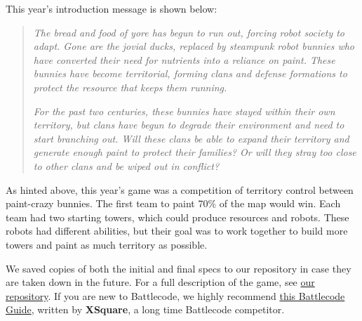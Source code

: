 This year's introduction message is shown below:

\begin{quote}
  \textit{The bread and food of yore has begun to run out, forcing robot society to adapt. Gone are the jovial ducks, replaced by steampunk robot bunnies who have converted their need for nutrients into a reliance on paint. These bunnies have become territorial, forming clans and defense formations to protect the resource that keeps them running.}
  
  \medskip
  
  \textit{For the past two centuries, these bunnies have stayed within their own territory, but clans have begun to degrade their environment and need to start branching out. Will these clans be able to expand their territory and generate enough paint to protect their families? Or will they stray too close to other clans and be wiped out in conflict?}
\end{quote}

As hinted above, this year's game was a competition of territory control between paint-crazy bunnies. The first team to paint 70\% of the map would win. Each team had two starting towers, which could produce resources and robots. These robots had different abilities, but their goal was to work together to build more towers and paint as much territory as possible.

\medskip

We saved copies of both the initial and final specs to our repository in case they are taken down in the future. For a full description of the game, see \href{https://github.com/justinottesen/battlecode25}{our repository}. If you are new to Battlecode, we highly recommend \href{https://battlecode.org/assets/files/battlecode-guide-xsquare.pdf}{this Battlecode Guide}, written by \textbf{XSquare}, a long time Battlecode competitor.